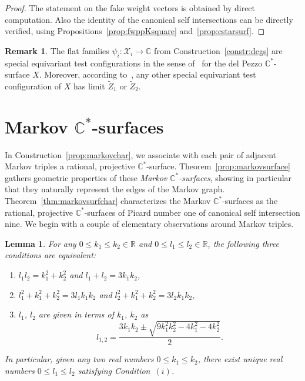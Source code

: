 \documentclass[pdftex]{sigma}
\newtheorem{lem}[thm]{Lemma}
\theoremstyle{definition}
\newtheorem{rem}[thm]{Remark}
\def\CC{{\mathbb C}}
\def\RR{{\mathbb R}}
\begin{document}
\begin{proof}
The statement on the fake weight vectors is
obtained by direct computation.
Also the identity of the canonical self
intersections can be directly verified,
using Propositions~\ref{prop:fwppKsquare}
and~\ref{prop:cstarsurf}.
\end{proof}


\begin{rem}
The flat families $\psi_i \colon \mathcal{X}_i \to \CC$
from Construction~\ref{constr:degs} are special equivariant
test configurations in the sense of~\cite[Definition~5.2]{HaHaSu}
for the del Pezzo $\CC^*$-surface $X$.
Moreover, according to~\cite[Proposition~5.4]{HaHaSu},
any other special equivariant test configuration of
$X$ has limit $\tilde Z_1$ or $\tilde Z_2$.
\end{rem}




\section[Markov C\^{}*-surfaces]{Markov $\boldsymbol{\CC^*}$-surfaces}

In Construction~\ref{prop:markovchar}, we associate
with each pair of adjacent Markov triples
a rational, projective $\CC^*$-surface.
Theorem~\ref{prop:markovsurface} gathers geometric
properties of these \emph{Markov $\CC^*$-surfaces},
showing in particular that they naturally represent
the edges of the Markov graph.
Theorem~\ref{thm:markovsurfchar}
characterizes the Markov $\CC^*$-surfaces
as the rational, projective $\CC^*$-surfaces
of Picard number one of canonical self intersection
nine.
We begin with a couple of elementary observations
around Markov triples.



\begin{lem}
\label{lem:markovchar}
For any $0 \le k_1 \le k_2 \in \RR$ and $0 \le l_1 \le l_2 \in \RR$,
the following three conditions are equivalent:
\begin{enumerate}\itemsep=0pt
\item[$(i)$]
$l_1l_2 = k_1^2 + k_2^2$ and $l_1+l_2 = 3k_1k_2$,
\item[$(ii)$]
$l_1^2 + k_1^2 + k_2^2 = 3l_1k_1k_2$ and $l_2^2 + k_1^2 + k_2^2 = 3l_2k_1k_2$,
\item[$(iii)$]
$l_1$, $l_2$ are given in terms of $k_1$, $k_2$ as
\[
l_{1,2} = \frac{3k_1k_2 \pm \sqrt{9k_1^2k_2^2 - 4k_1^2 - 4k_2^2}}{2}.
\]
\end{enumerate}
In particular, given any two real numbers $0 \le k_1 \le k_2$,
there exist unique real numbers $0 \le l_1 \le l_2$
satisfying Condition~$(i)$.
\end{lem}
\end{document}
